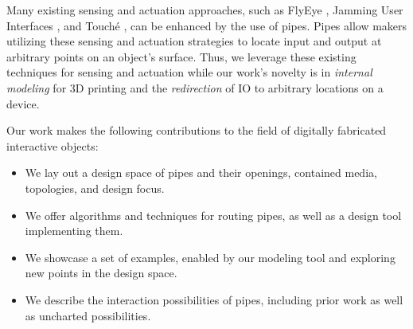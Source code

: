 Many existing sensing and actuation approaches, such as FlyEye \cite{Wimmer-flyeye}, Jamming User Interfaces \cite{Follmer-jamming}, and Touch\'{e} \cite{Sato-touche}, can be enhanced by the use of pipes.  Pipes allow makers utilizing these sensing and actuation strategies to locate input and output at arbitrary points on an object's surface.  Thus, we leverage these existing techniques for sensing and actuation while our work's novelty is in \emph{internal modeling} for 3D printing and the \emph{redirection} of IO to arbitrary locations on a device.

Our work makes the following contributions to the field of digitally fabricated interactive objects:

\begin{itemize}
\item We lay out a design space of pipes and their openings, contained media, topologies, and design focus.
\item We offer algorithms and techniques for routing pipes, as well as a design tool implementing them.
\item We showcase a set of examples, enabled by our modeling tool and exploring new points in the design space.
\item We describe the interaction possibilities of pipes, including prior work as well as uncharted possibilities. 
\end{itemize}